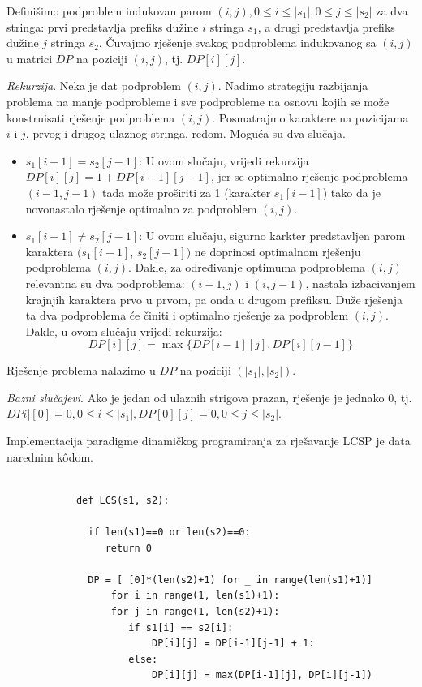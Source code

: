 \begin{solution}
	    Definišimo podproblem indukovan parom $(i,j), 0 \leq i \leq |s_1|, 0 \leq j \leq |s_2|$  za dva stringa: prvi predstavlja  prefiks dužine $i$ stringa $s_1$,  a drugi predstavlja prefiks dužine $j$ stringa $s_2$.  Čuvajmo rješenje svakog podproblema indukovanog sa $(i,j)$ u matrici $DP$ na poziciji $(i, j)$, tj. $DP[i][j]$.
	    
	    \textit{Rekurzija}. Neka je dat podproblem $(i, j)$. Nađimo strategiju razbijanja problema na manje podprobleme i sve podprobleme na osnovu kojih se može konstruisati rješenje podproblema $(i, j)$. Posmatrajmo karaktere na pozicijama $i$ i $j$, prvog i drugog ulaznog stringa, redom.  Moguća su dva slučaja.
	    \begin{itemize}
	    	\item $s_1[i-1] = s_2[j-1]$: U ovom slučaju, vrijedi rekurzija $DP[i][j] = 1 + DP[i-1][j-1]$, jer  se optimalno rješenje podproblema $(i-1, j-1)$ tada može proširiti za 1 (karakter $s_1[i-1]$) tako da je novonastalo rješenje optimalno za podproblem $(i,j)$.
	    	\item  $s_1[i-1] \neq s_2[j-1]$: U ovom slučaju, sigurno karkter predstavljen parom karaktera $(s_1[i-1]$, $s_2[j-1])$ ne doprinosi optimalnom rješenju podproblema $(i,j)$. Dakle,  za određivanje optimuma podproblema $(i,j)$ relevantna su dva podproblema: $(i-1, j)$ i $(i, j-1)$, nastala izbacivanjem krajnjih karaktera prvo u prvom, pa onda u drugom prefiksu. Duže rješenja ta dva podproblema će činiti i optimalno rješenje za podproblem $(i,j)$. Dakle, u ovom slučaju vrijedi rekurzija:
	    	$$DP[i][j] = \max \{ DP[i-1][j], DP[i][j-1] \} $$ 
	    	
	    \end{itemize}
	    Rješenje problema nalazimo u $DP$ na poziciji $(|s_1|, |s_2|)$. 
	    
	    \textit{Bazni slučajevi}. Ako je jedan od ulaznih strigova prazan, rješenje je jednako 0, tj.  $DPi][0]= 0, 0 \leq i \leq |s_1|,  DP[0][j] = 0, 0 \leq j \leq |s_2|$. 
	    
	 Implementacija paradigme dinamičkog programiranja za rješavanje LCSP je data narednim k\^odom. 
 \begin{verbatim}
	    	
	    	def LCS(s1, s2):
	    	      
	    	  if len(s1)==0 or len(s2)==0:
	    	     return 0
	    	     
	    	  DP = [ [0]*(len(s2)+1) for _ in range(len(s1)+1)]
	              for i in range(1, len(s1)+1):
	    	      for j in range(1, len(s2)+1):
	    		     if s1[i] == s2[i]: 
	    		         DP[i][j] = DP[i-1][j-1] + 1:
	    		     else:
	    		         DP[i][j] = max(DP[i-1][j], DP[i][j-1])
	    		          

\end{verbatim}
\end{solution}
